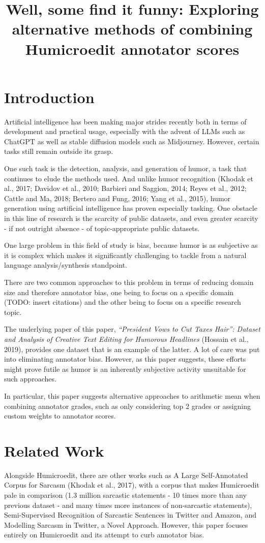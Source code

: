 \documentclass[10pt, a4paper]{article}
\title{Well, some find it funny: Exploring alternative methods of combining Humicroedit annotator scores}
\begin{document}
\maketitleabstract

\section{Introduction}
\label{sec:intro}

Artificial intelligence has been making major strides recently both in terms of development and practical usage, especially with the advent of LLMs such as ChatGPT as well as stable diffusion models such as Midjourney. However, certain tasks still remain outside its grasp. 

One such task is the detection, analysis, and generation of humor, a task that continues to elude the methods used. And unlike humor recognition (Khodak et al., 2017; Davidov et al., 2010; Barbieri and Saggion, 2014; Reyes et al., 2012; Cattle and Ma, 2018; Bertero and Fung, 2016; Yang et al., 2015), humor generation using artificial intelligence has proven especially tasking. One obstacle in this line of research is the scarcity of public datasets, and even greater scarcity - if not outright absence - of topic-appropriate public datasets.

One large problem in this field of study is bias, because humor is as subjective as it is complex which makes it significantly challenging to tackle from a natural language analysis/synthesis standpoint.

There are two common approaches to this problem in terms of reducing domain size and therefore annotator bias, one being to focus on a specific domain (TODO: insert citations) and the other being to focus on a specific research topic.

The underlying paper of this paper, \textit{“President Vows to Cut Taxes Hair”:
Dataset and Analysis of Creative Text Editing for Humorous Headlines} (Hossain et al., 2019), provides one dataset that is an example of the latter. A lot of care was put into eliminating annotator bias. However, as this paper suggests, these efforts might prove futile as humor is an inherently subjective activity unsuitable for such approaches.

In particular, this paper suggests alternative approaches to arithmetic mean when combining annotator grades, such as only considering top 2 grades or assigning custom weights to annotator scores.

\section{Related Work}
Alongside Humicroedit, there are other works such as A Large Self-Annotated Corpus for Sarcasm (Khodak et al., 2017), with a corpus that makes Humicroedit pale in comparison (1.3 million sarcastic statements - 10 times more than any previous dataset - and many times more instances of non-sarcastic statements),
Semi-Supervised Recognition of Sarcastic Sentences in Twitter and Amazon, and Modelling Sarcasm in Twitter, a Novel Approach. However, this paper focuses entirely on Humicroedit and its attempt to curb annotator bias.
\end{document}
